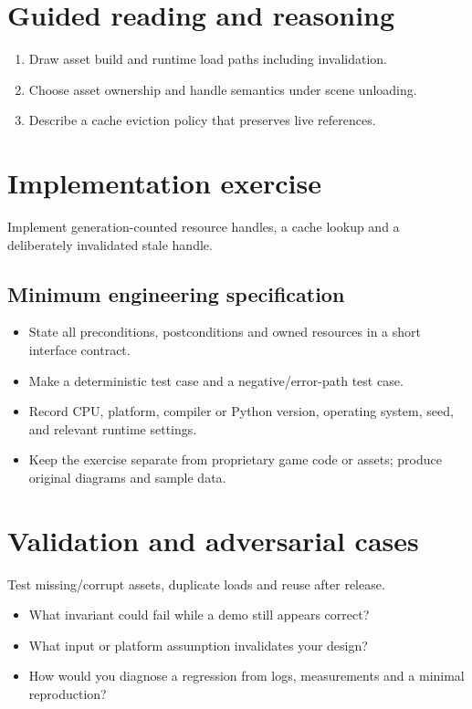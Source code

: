 \documentclass[11pt,letterpaper]{article}
\begin{document}
\section{Guided reading and reasoning}
\begin{enumerate}
\item Draw asset build and runtime load paths including invalidation.
\item Choose asset ownership and handle semantics under scene unloading.
\item Describe a cache eviction policy that preserves live references.
\end{enumerate}
\section{Implementation exercise}
Implement generation-counted resource handles, a cache lookup and a deliberately invalidated stale handle.

\subsection{Minimum engineering specification}
\begin{itemize}
\item State all preconditions, postconditions and owned resources in a short interface contract.
\item Make a deterministic test case and a negative/error-path test case.
\item Record CPU, platform, compiler or Python version, operating system, seed, and relevant runtime settings.
\item Keep the exercise separate from proprietary game code or assets; produce original diagrams and sample data.
\end{itemize}
\section{Validation and adversarial cases}
Test missing/corrupt assets, duplicate loads and reuse after release.

\begin{itemize}
\item What invariant could fail while a demo still appears correct?
\item What input or platform assumption invalidates your design?
\item How would you diagnose a regression from logs, measurements and a minimal reproduction?
\end{itemize}
\end{document}
